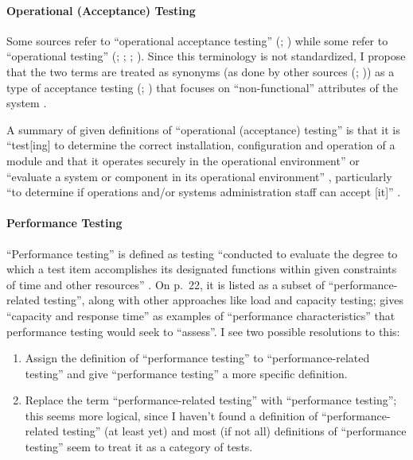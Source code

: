 \paragraph{Operational (Acceptance) Testing}
Some sources refer to ``operational acceptance testing'' (\citealp[p.~22]{IEEE2022};
) while some refer to ``operational testing''
(\citealp[p.~6-9, in the context of software engineering operations]{SWEBOK2024};
\citealp{ISO_IEC2018}; \citealp[p.~303]{IEEE2017};
\citealp[pp.~4-6, 4-9]{SWEBOK2014}). Since this terminology is not standardized, I
propose that the two terms are treated as synonyms (as done by other sources
(\citealp{LambdaTest2024}; \citealp{BocchinoAndHamilton1996})) as a type of
acceptance testing (\citealp[p.~22]{IEEE2022}; ) that focuses on
``non-functional'' attributes of the system \citep{LambdaTest2024}
.

A summary of given definitions of ``operational (acceptance) testing'' is that
it is ``test[ing] to determine the correct
installation, configuration and operation of a module and that it operates
securely in the operational environment'' \citep{ISO_IEC2018} or ``evaluate a
system or component in its operational environment'' \citep[p.~303]{IEEE2017},
particularly ``to determine if operations and/or systems administration staff
can accept [it]'' .

\paragraph{Performance Testing}

``Performance testing'' is defined as testing ``conducted to
evaluate the degree to which a test item accomplishes its
designated functions within given constraints of time and other
resources'' \citep[p.~7]{IEEE2022}. On p.~22, it is listed
as a subset of ``performance-related testing'', along with other
approaches like load and capacity testing; \citet[p.~5-9]{SWEBOK2024}
gives ``capacity and response time'' as examples of ``performance
characteristics'' that performance testing would seek to ``assess''.
I see two possible resolutions to this:
\begin{enumerate}
      \item Assign the definition of ``performance testing'' to
            ``performance-related testing'' and give ``performance
            testing'' a more specific definition.
      \item Replace the term ``performance-related testing'' with
            ``performance testing''; this seems more logical, since
            I haven't found a definition of ``performance-related
            testing'' (at least yet) and most (if not all)
            definitions of ``performance testing'' seem to treat it
            as a category of tests.
\end{enumerate}
\label{perf-test-ambiguity}

